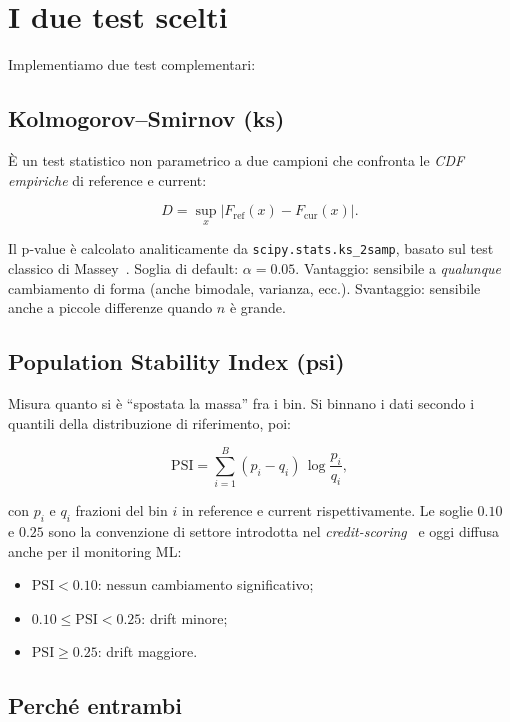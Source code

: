 \section{I due test scelti}

Implementiamo due test complementari:

\subsection{Kolmogorov--Smirnov (\texorpdfstring{\acrshort{ks}}{KS})}

È un test statistico non parametrico a due campioni che confronta le
\emph{CDF empiriche} di reference e current:

\[
D = \sup_{x} |F_\text{ref}(x) - F_\text{cur}(x)|.
\]

Il p-value è calcolato analiticamente da \texttt{scipy.stats.ks\_2samp},
basato sul test classico di Massey~\cite{massey1951ks}. Soglia di
default: $\alpha = 0.05$. Vantaggio: sensibile a \emph{qualunque}
cambiamento di forma (anche bimodale, varianza, ecc.). Svantaggio:
sensibile anche a piccole differenze quando $n$ è grande.

\subsection{Population Stability Index (\texorpdfstring{\acrshort{psi}}{PSI})}

Misura quanto si è ``spostata la massa'' fra i bin. Si binnano i dati
secondo i quantili della distribuzione di riferimento, poi:

\[
\mathrm{PSI} = \sum_{i=1}^{B}(p_i - q_i)\,\log\!\frac{p_i}{q_i},
\]

con $p_i$ e $q_i$ frazioni del bin $i$ in reference e current
rispettivamente. Le soglie $0.10$ e $0.25$ sono la convenzione di settore
introdotta nel \emph{credit-scoring}~\cite{siddiqi2017credit} e oggi
diffusa anche per il monitoring ML:
\begin{itemize}
  \item $\mathrm{PSI} < 0.10$: nessun cambiamento significativo;
  \item $0.10 \leq \mathrm{PSI} < 0.25$: drift minore;
  \item $\mathrm{PSI} \geq 0.25$: drift maggiore.
\end{itemize}

\subsection{Perché entrambi}

